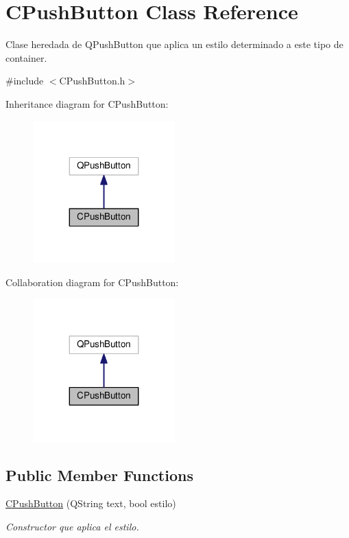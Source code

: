 \hypertarget{classCPushButton}{}\section{C\+Push\+Button Class Reference}
\label{classCPushButton}


Clase heredada de \textquotesingle{}Q\+Push\+Button\textquotesingle{} que aplica un estilo determinado a este tipo de container.  




{\ttfamily \#include $<$C\+Push\+Button.\+h$>$}



Inheritance diagram for C\+Push\+Button\+:\nopagebreak
\begin{figure}[H]
\begin{center}
\leavevmode
\includegraphics[width=155pt]{classCPushButton__inherit__graph}
\end{center}
\end{figure}


Collaboration diagram for C\+Push\+Button\+:\nopagebreak
\begin{figure}[H]
\begin{center}
\leavevmode
\includegraphics[width=155pt]{classCPushButton__coll__graph}
\end{center}
\end{figure}
\subsection*{Public Member Functions}
\begin{DoxyCompactItemize}
\item 
\hyperlink{classCPushButton_afbe6d5ef008dc7e41b14c4875ae0274b}{C\+Push\+Button} (Q\+String text, bool estilo)
\begin{DoxyCompactList}\small\item\em Constructor que aplica el estilo. \end{DoxyCompactList}\end{DoxyCompactItemize}


